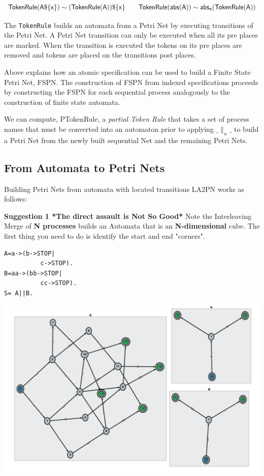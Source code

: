 \documentclass[]{article}
\begin{document}
{\[{\sf TokenRule({\sf A}\$\{x\}) \sim  (TokenRule({\sf A}))\$\{x\}  \qquad     TokenRule(abs({\sf A}))\sim  abs_n(TokenRule({\sf A})) }\]  


The \verb|TokenRule|  builds an automata from a Petri Net by executing transitions of the Petri Net.  A Petri Net transition can only  be executed when all its pre places are marked. When the transition is executed the tokens on its pre places are removed and tokens are placed on the transitions post places.

Above explains how an atomic specification can be used to build a Finite State Petri Net, FSPN.  The construction of FSPN from indexed specifications  proceeds by constructing the FSPN for each sequential process analogously to the construction of finite state automata. 

We can compute, {\sf PTokenRule},  a \emph{partial Token Rule} that takes a set of process names that must be converted into an automaton  prior to applying $\_\parallel_n\_$ to build a Petri Net from the newly built sequential Net and the remaining Petri Nets.


\subsection{From Automata to Petri Nets}
Building Petri Nets from automata with located transitions {\sf LA2PN} works as follows:

{\bf Suggestion 1 *The direct assault is Not So Good*} 
Note the Interleaving Merge of {\bf N processes} builds  an Automata that is an {\bf N-dimensional} cube. The first thing you need to do is identify the start and end "corners". 

\vspace{1em} \begin{minipage}{0.2\textwidth}
\begin{verbatim}
A=a->(b->STOP|
          c->STOP).
B=aa->(bb->STOP|
          cc->STOP).
S= A||B.
  \end{verbatim} 
\end{minipage}
\begin{minipage}{0.6\textwidth}
\begin{center}\includegraphics[scale=0.4]{Surface.png}\end{center}
\end{minipage}

}
\end{document}

